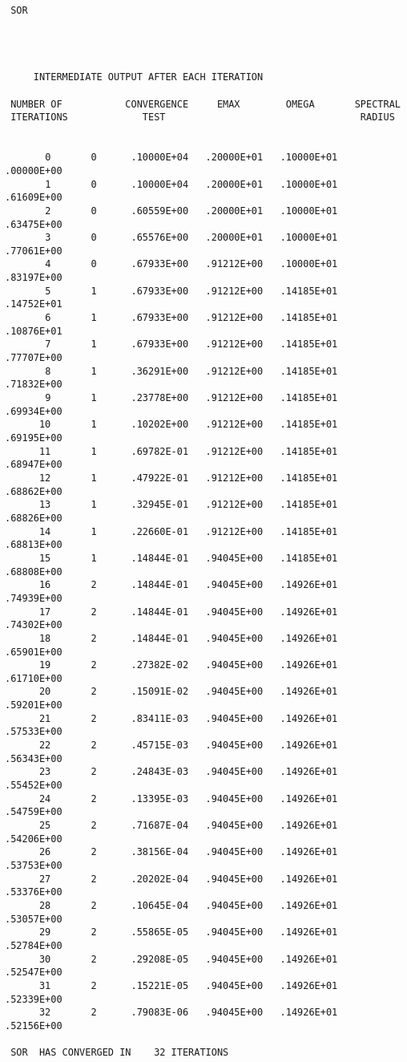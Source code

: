 \begin{verbatim}
 SOR
 
 
 
 
     INTERMEDIATE OUTPUT AFTER EACH ITERATION
 
 NUMBER OF           CONVERGENCE     EMAX        OMEGA       SPECTRAL 
 ITERATIONS             TEST                                  RADIUS
 
 
       0       0      .10000E+04   .20000E+01   .10000E+01   .00000E+00
       1       0      .10000E+04   .20000E+01   .10000E+01   .61609E+00
       2       0      .60559E+00   .20000E+01   .10000E+01   .63475E+00
       3       0      .65576E+00   .20000E+01   .10000E+01   .77061E+00
       4       0      .67933E+00   .91212E+00   .10000E+01   .83197E+00
       5       1      .67933E+00   .91212E+00   .14185E+01   .14752E+01
       6       1      .67933E+00   .91212E+00   .14185E+01   .10876E+01
       7       1      .67933E+00   .91212E+00   .14185E+01   .77707E+00
       8       1      .36291E+00   .91212E+00   .14185E+01   .71832E+00
       9       1      .23778E+00   .91212E+00   .14185E+01   .69934E+00
      10       1      .10202E+00   .91212E+00   .14185E+01   .69195E+00
      11       1      .69782E-01   .91212E+00   .14185E+01   .68947E+00
      12       1      .47922E-01   .91212E+00   .14185E+01   .68862E+00
      13       1      .32945E-01   .91212E+00   .14185E+01   .68826E+00
      14       1      .22660E-01   .91212E+00   .14185E+01   .68813E+00
      15       1      .14844E-01   .94045E+00   .14185E+01   .68808E+00
      16       2      .14844E-01   .94045E+00   .14926E+01   .74939E+00
      17       2      .14844E-01   .94045E+00   .14926E+01   .74302E+00
      18       2      .14844E-01   .94045E+00   .14926E+01   .65901E+00
      19       2      .27382E-02   .94045E+00   .14926E+01   .61710E+00
      20       2      .15091E-02   .94045E+00   .14926E+01   .59201E+00
      21       2      .83411E-03   .94045E+00   .14926E+01   .57533E+00
      22       2      .45715E-03   .94045E+00   .14926E+01   .56343E+00
      23       2      .24843E-03   .94045E+00   .14926E+01   .55452E+00
      24       2      .13395E-03   .94045E+00   .14926E+01   .54759E+00
      25       2      .71687E-04   .94045E+00   .14926E+01   .54206E+00
      26       2      .38156E-04   .94045E+00   .14926E+01   .53753E+00
      27       2      .20202E-04   .94045E+00   .14926E+01   .53376E+00
      28       2      .10645E-04   .94045E+00   .14926E+01   .53057E+00
      29       2      .55865E-05   .94045E+00   .14926E+01   .52784E+00
      30       2      .29208E-05   .94045E+00   .14926E+01   .52547E+00
      31       2      .15221E-05   .94045E+00   .14926E+01   .52339E+00
      32       2      .79083E-06   .94045E+00   .14926E+01   .52156E+00
 
 SOR  HAS CONVERGED IN    32 ITERATIONS 
 
\end{verbatim}
